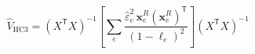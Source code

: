 \par\needspace{88pt}\begin{minipage}{\linewidth}
\begin{equation}\widehat V_{\mathrm{HC3}}=(X^{\mathsf T}X)^{-1}\!\left[\sum_e\frac{\hat\varepsilon_e^2\,\mathbf{x}_e^{R}(\mathbf{x}_e^{R})^{\mathsf T}}{(1-\ell_e)^2}\right](X^{\mathsf T}X)^{-1}\label{eq:11}\end{equation}
\end{minipage}\par
